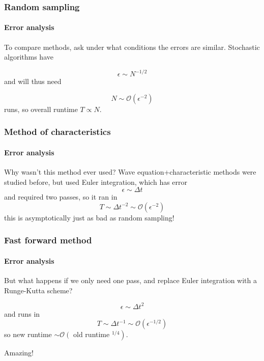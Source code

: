 \documentclass{beamer}
\begin{document}
\begin{frame}
    \frametitle{Random sampling}
    \framesubtitle{Error analysis}

    To compare methods, ask under what conditions the errors are
    similar. Stochastic algorithms have 

    \begin{equation}
        \epsilon \sim N^{-1/2}
    \end{equation}
    and will thus need
    
    \begin{equation}
        N \sim \mathcal{O}(\epsilon^{-2})
    \end{equation}
    runs, so overall runtime $T \propto N$.

\end{frame}

\begin{frame}
    \frametitle{Method of characteristics}
    \framesubtitle{Error analysis}

    Why wasn't this method ever used? Wave equation+characteristic methods were
    studied before, but used Euler integration, which has error
    \begin{equation}
        \epsilon \sim \Delta t
    \end{equation}
    and required two passes, so it ran in
    \begin{equation}
        T \sim \Delta t^{-2} \sim \mathcal{O}(\epsilon^{-2})
    \end{equation}
    this is asymptotically just as bad as random sampling! 
\end{frame}

\begin{frame}
    \frametitle{Fast forward method}
    \framesubtitle{Error analysis}
    But what happens if we only need one pass, and replace Euler integration with a Runge-Kutta scheme?

    \begin{equation}
        \epsilon \sim \Delta t^2
    \end{equation}
    and runs in 
    \begin{equation}
        T \sim \Delta t^{-1} \sim \mathcal{O}(\epsilon^{-1/2})
    \end{equation}
    so new runtime $\sim \mathcal{O}\left(\right.$ old runtime
    $\left.^{1/4}\right)$.

    \;

    Amazing!
\end{frame}
\end{document}
